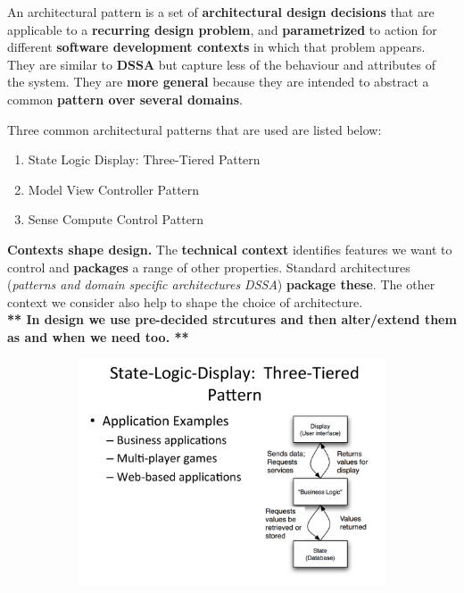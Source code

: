 \documentclass[a4paper]{article}
\begin{document}
An architectural pattern is a set of \textbf{architectural design decisions} that are applicable to a \textbf{recurring design problem}, and \textbf{parametrized} to action for different \textbf{software development contexts} in which that problem appears.\\

They are similar to \textbf{DSSA} but capture less of the behaviour and attributes of the system. They are \textbf{more general} because they are intended to abstract a common \textbf{pattern over several domains}.

Three common architectural patterns that are used are listed below:
\begin{enumerate}
\item State Logic Display: Three-Tiered Pattern
\item Model View Controller Pattern
\item Sense Compute Control Pattern\\
\end{enumerate}

\textbf{Contexts shape design.} The \textbf{technical context} identifies features we want to control and \textbf{packages} a range of other properties. Standard architectures (\textit{patterns and domain specific architectures DSSA}) \textbf{package these}. The other context we consider also help to shape the choice of architecture.\\

\textbf{** In design we use pre-decided strcutures and then alter/extend them as and when we need too. **}


\begin{figure}[H]
\hskip-2.5cm\begin{subfigure}{1.2\textwidth}
  \includegraphics[width=1.2\linewidth]
  {images/3-SLD-pattern}
\end{subfigure}
\end{figure}
\end{document}
